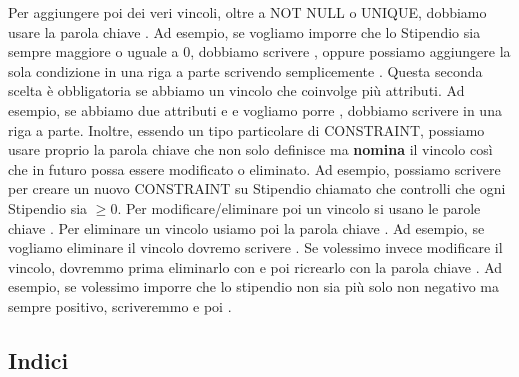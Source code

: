 \documentclass[11pt, a4paper, titlepage, oneside]{scrbook}
\begin{document}
Per aggiungere poi dei veri vincoli, oltre a NOT NULL o UNIQUE, dobbiamo usare la parola chiave . Ad esempio, se vogliamo imporre che lo Stipendio sia sempre maggiore o uguale a 0, dobbiamo scrivere , oppure possiamo aggiungere la sola condizione in una riga a parte scrivendo semplicemente \mbox{}. Questa seconda scelta è obbligatoria se abbiamo un vincolo che coinvolge più attributi. Ad esempio, se abbiamo due attributi  e  e vogliamo porre \mbox{}, dobbiamo scrivere  in una riga a parte. Inoltre, essendo  un tipo particolare di CONSTRAINT, possiamo usare proprio la parola chiave  che non solo definisce ma \textbf{nomina} il vincolo così che in futuro possa essere modificato o eliminato. Ad esempio, possiamo scrivere \mbox{} per creare un nuovo CONSTRAINT su Stipendio chiamato  che controlli che ogni Stipendio sia $\geq 0$. Per modificare/eliminare poi un vincolo si usano le parole chiave . Per eliminare un vincolo usiamo poi la parola chiave . Ad esempio, se vogliamo eliminare il vincolo  dovremo scrivere \mbox{}. Se volessimo invece modificare il vincolo, dovremmo prima eliminarlo con  e poi ricrearlo con la parola chiave . Ad esempio, se volessimo imporre che lo stipendio non sia più solo non negativo ma sempre positivo, scriveremmo  e poi .

\subsection*{Indici}
\end{document}
